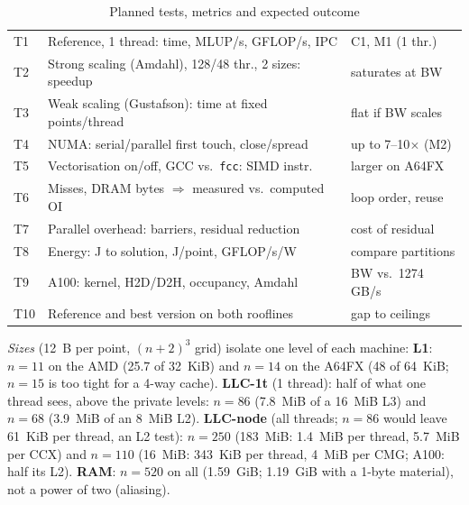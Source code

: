 \documentclass[conference,10pt]{IEEEtran}
\begin{document}
\begin{table}[!t]\centering\scriptsize
\caption{Planned tests, metrics and expected outcome}\label{tab:tests}
\begin{tabular}{@{}lp{}p{}@{}}\toprule
T1 & Reference, 1 thread: time, MLUP/s, GFLOP/s, IPC & C1, M1 (1 thr.) \\
T2 & Strong scaling (Amdahl), 128/48 thr., 2 sizes: speedup & saturates at BW \\
T3 & Weak scaling (Gustafson): time at fixed points/thread & flat if BW scales \\
T4 & NUMA: serial/parallel first touch, close/spread & up to 7--10$\times$ (M2) \\
T5 & Vectorisation on/off, GCC vs.\ \texttt{fcc}: SIMD instr. & larger on A64FX \\
T6 & Misses, DRAM bytes $\Rightarrow$ measured vs.\ computed OI & loop order, reuse \\
T7 & Parallel overhead: barriers, residual reduction & cost of residual \\
T8 & Energy: J to solution, J/point, GFLOP/s/W & compare partitions \\
T9 & A100: kernel, H2D/D2H, occupancy, Amdahl~\cite{hillmarty} & BW vs.\ 1274 GB/s \\
T10 & Reference and best version on both rooflines & gap to ceilings \\ \bottomrule
\end{tabular}
\end{table}

\emph{Sizes} (12~B per point, $(n+2)^3$ grid) isolate one level of each machine: \textbf{L1}: $n=11$ on the AMD (25.7 of 32~KiB) and $n=14$ on the A64FX (48 of
64~KiB; $n=15$ is too tight for a 4-way cache). \textbf{LLC-1t} (1 thread): half of what one thread sees, above
the private levels: $n=86$ (7.8~MiB of a 16~MiB L3) and $n=68$ (3.9~MiB of an 8~MiB L2).
\textbf{LLC-node} (all threads; $n=86$ would leave 61~KiB per thread, an L2 test):
$n=250$ (183~MiB: 1.4~MiB per thread, 5.7~MiB per CCX) and $n=110$ (16~MiB: 343~KiB per thread,
4~MiB per CMG; A100: half its L2). \textbf{RAM}: $n=520$ on all (1.59~GiB; 1.19~GiB with a 1-byte material), not a power of two
(aliasing).
\end{document}
